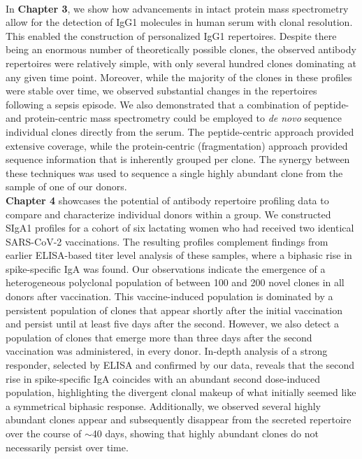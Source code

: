 \bigskip\\
In \textbf{Chapter 3}, we show how advancements in intact protein mass spectrometry allow for the detection of IgG1 molecules in human serum with clonal resolution. This enabled the construction of personalized IgG1 repertoires. Despite there being an enormous number of theoretically possible clones, the observed antibody repertoires were relatively simple, with only several hundred clones dominating at any given time point. Moreover, while the majority of the clones in these profiles were stable over time, we observed substantial changes in the repertoires following a sepsis episode. We also demonstrated that a combination of peptide- and protein-centric mass spectrometry could be employed to \emph{de novo} sequence individual clones directly from the serum. The peptide-centric approach provided extensive coverage, while the protein-centric (fragmentation) approach provided sequence information that is inherently grouped per clone. The synergy between these techniques was used to sequence a single highly abundant clone from the sample of one of our donors.
\bigskip\\
\textbf{Chapter 4} showcases the potential of antibody repertoire profiling data to compare and characterize individual donors within a group. We constructed SIgA1 profiles for a cohort of six lactating women who had received two identical SARS-CoV-2 vaccinations. The resulting profiles complement findings from earlier ELISA-based titer level analysis of these samples, where a biphasic rise in spike-specific IgA was found. Our observations indicate the emergence of a heterogeneous polyclonal population of between 100 and 200 novel clones in all donors after vaccination. This vaccine-induced population is dominated by a persistent population of clones that appear shortly after the initial vaccination and persist until at least five days after the second. However, we also detect a population of clones that emerge more than three days after the second vaccination was administered, in every donor. In-depth analysis of a strong responder, selected by ELISA and confirmed by our data, reveals that the second rise in spike-specific IgA coincides with an abundant second dose-induced population, highlighting the divergent clonal makeup of what initially seemed like a symmetrical biphasic response. Additionally, we observed several highly abundant clones appear and subsequently disappear from the secreted repertoire over the course of $\sim$40 days, showing that highly abundant clones do not necessarily persist over time.
